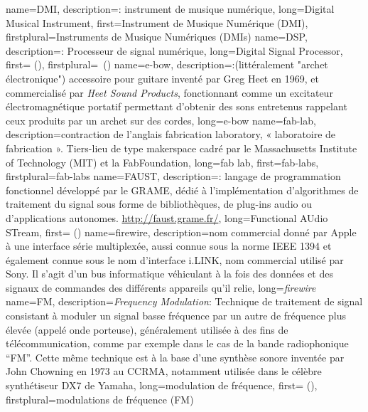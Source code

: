 {
    name={DMI},
    description={\textit{}: instrument de musique numérique},
    long={Digital Musical Instrument},
    first={Instrument de Musique Numérique (DMI)},
    firstplural={Instruments de Musique Numériques (DMIs)}
}
{
    name={DSP},
    description={\textit{}: Processeur de signal numérique},
    long={Digital Signal Processor},
    first={} (),
    firstplural={\glspluralsuffix\ (\glspluralsuffix)}
}
{
    name={e-bow},
    description={\textit{}:(littéralement "archet électronique") accessoire pour guitare inventé par Greg Heet en 1969, et commercialisé par \textit{Heet Sound Products}, fonctionnant comme un excitateur électromagnétique portatif permettant d'obtenir des sons entretenus rappelant ceux produits par un archet sur des cordes},
    long={e-bow}
}
{
    name={fab-lab},
    description={contraction de l'anglais fabrication laboratory, « laboratoire de fabrication ». Tiers-lieu de type \gls{makerspace} cadré par le Massachusetts Institute of Technology (MIT) et la FabFoundation},
    long={fab lab},
    first={fab-labs},
    firstplural={fab-labs}
}
{
    name={FAUST},
    description={\textit{}: langage de programmation fonctionnel développé par le \gls{GRAME}, dédié à l'implémentation d'algorithmes de traitement du signal sous forme de bibliothèques, de plug-ins audio ou d'applications autonomes. \url{http://faust.grame.fr/}},
    long={Functional AUdio STream},
    first={} ()
}
{
    name={firewire},
    description={nom commercial donné par Apple à une interface série multiplexée, aussi connue sous la norme IEEE 1394 et également connue sous le nom d'interface i.LINK, nom commercial utilisé par Sony. Il s'agit d'un bus informatique véhiculant à la fois des données et des signaux de commandes des différents appareils qu'il relie},
    long={\textit{firewire}}
}
{
    name={FM},
    description={\textit{Frequency Modulation}: Technique de traitement de signal consistant à moduler un signal basse fréquence par un autre de fréquence plus élevée (appelé onde porteuse), généralement utilisée à des fins de télécommunication, comme par exemple dans le cas de la bande radiophonique ``FM''. Cette même technique est à la base d'une synthèse sonore inventée par John Chowning en 1973 au \gls{CCRMA}, notamment utilisée dans le célèbre synthétiseur DX7 de Yamaha},
    long={modulation de fréquence},
    first={ ()},
    firstplural={modulations de fréquence (FM)}
}

